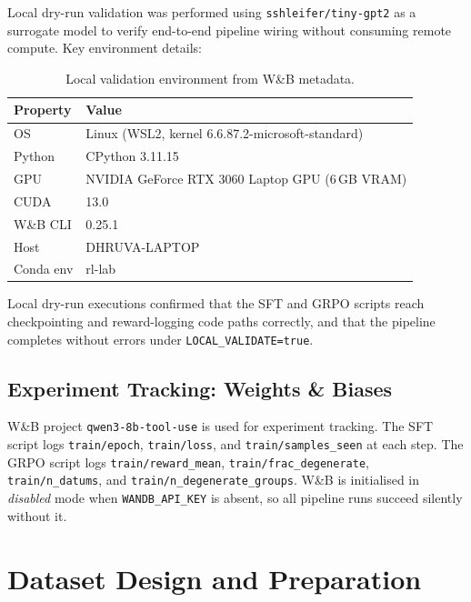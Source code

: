 \documentclass[12pt, a4paper]{article}
\newcommand{\thead}[1]{\textbf{#1}}
\begin{document}
Local dry-run validation was performed using \texttt{sshleifer/tiny-gpt2} as a
surrogate model to verify end-to-end pipeline wiring without consuming remote
compute. Key environment details:

\begin{table}[H]
\centering
\caption{Local validation environment from W\&B metadata.}
\begin{tabularx}{\linewidth}{L{3.5cm} L{10.7cm}}
\toprule
\thead{Property} & \thead{Value} \\
\midrule
OS & Linux (WSL2, kernel 6.6.87.2-microsoft-standard) \\
Python & CPython 3.11.15 \\
GPU & NVIDIA GeForce RTX 3060 Laptop GPU (6\,GB VRAM) \\
CUDA & 13.0 \\
W\&B CLI & 0.25.1 \\
Host & DHRUVA-LAPTOP \\
Conda env & rl-lab \\
\bottomrule
\end{tabularx}
\end{table}

Local dry-run executions confirmed that the SFT and GRPO scripts reach
checkpointing and reward-logging code paths correctly, and that the pipeline
completes without errors under \texttt{LOCAL\_VALIDATE=true}.

\subsection{Experiment Tracking: Weights \& Biases}

W\&B project \texttt{qwen3-8b-tool-use} is used for experiment tracking.
The SFT script logs \texttt{train/epoch}, \texttt{train/loss}, and
\texttt{train/samples\_seen} at each step. The GRPO script logs
\texttt{train/reward\_mean}, \texttt{train/frac\_degenerate},
\texttt{train/n\_datums}, and \texttt{train/n\_degenerate\_groups}.
W\&B is initialised in \textit{disabled} mode when \texttt{WANDB\_API\_KEY}
is absent, so all pipeline runs succeed silently without it.

\newpage

\section{Dataset Design and Preparation}
\end{document}
